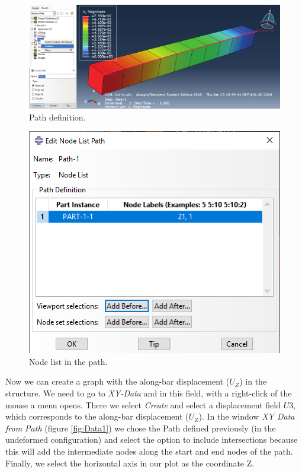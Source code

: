 \documentclass[spanish,a4paper,12pt]{article}
\begin{document}
\begin{figure}[h!tp]
\centering
\includegraphics[scale=0.75]{capturas/path.pdf}
\caption{Path definition.}
\label{fig:path}%
\end{figure}
\clearpage

\begin{figure}[h!tp]
\centering
\includegraphics[scale=0.55]{capturas/path2.png}
\caption{Node list in the path.}
\label{fig:path2}%
\end{figure}

Now we can create a graph with the along-bar displacement ($U_Z$) in the structure. We need to go to \emph{XY-Data} and in this field, with a right-click of the mouse a menu opens. There we select \emph{Create} and select a displacement field $U3$, which corresponds to the along-bar displacement ($U_Z$). In the window \emph{XY Data from Path} (figure \ref{fig:Data1}) we chose the Path defined previously (in the undeformed configuration) and select the option to include intersections because this will add the intermediate nodes along the start and end nodes of the path. Finally, we select the horizontal axis in our plot as the coordinate Z.
\end{document}

